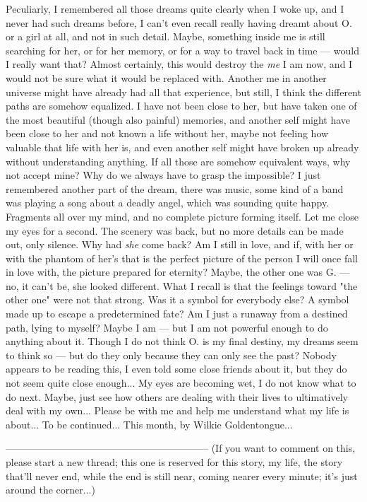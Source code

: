 Peculiarly, I remembered all those dreams quite clearly when I woke up, and I never had such dreams before, I can't even recall really having dreamt about O. or a girl at all, and not in such detail. Maybe, something inside me is still searching for her, or for her memory, or for a way to travel back in time --- would I really want that? Almost certainly, this would destroy the \emph{me} I am now, and I would not be sure what it would be replaced with. Another me in another universe might have already had all that experience, but still, I think the different paths are somehow equalized. I have not been close to her, but have taken one of the most beautiful (though also painful) memories, and another self might have been close to her and not known a life without her, maybe not feeling how valuable that life with her is, and even another self might have broken up already without understanding anything. 
If all those are somehow equivalent ways, why not accept mine? Why do we always have to grasp the impossible? 
I just remembered another part of the dream, there was music, some kind of a band was playing a song about a deadly angel, which was sounding quite happy. Fragments all over my mind, and no complete picture forming itself. Let me close my eyes for a second. 
The scenery was back, but no more details can be made out, only silence. Why had \emph{she} come back? Am I still in love, and if, with her or with the phantom of her's that is the perfect picture of the person I will once fall in love with, the picture prepared for eternity? 
Maybe, the other one was G. --- no, it can't be, she looked different. What I recall is that the feelings toward "the other one" were not that strong. Was it a symbol for everybody else? A symbol made up to escape a predetermined fate? Am I just a runaway from a destined path, lying to myself? Maybe I am --- but I am not powerful enough to do anything about it. Though I do not think O. is my final destiny, my dreams seem to think so --- but do they only because they can only see the past? 
Nobody appears to be reading this, I even told some close friends about it, but they do not seem quite close enough... 
My eyes are becoming wet, I do not know what to do next. Maybe, just see how others are dealing with their lives to ultimatively deal with my own... 
Please be with me and help me understand what my life is about... 
To be continued...
This month, by Wilkie Goldentongue...

--------------------------------------------------------------
(If you want to comment on this, please start a new thread; this one is reserved for this story, my life, the story that'll never end, while the end is still near, coming nearer every minute; it's just around the corner...)

